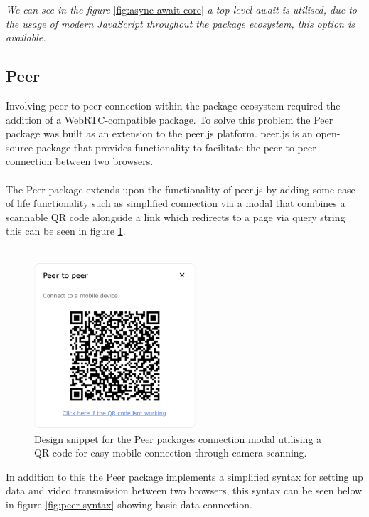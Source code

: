 \documentclass{l4proj}
\begin{document}
\textit{We can see in the figure }\ref{fig:async-await-core} \textit{a top-level await is utilised, due to the usage of modern JavaScript throughout the package ecosystem, this option is available.}

\subsection{Peer}
\text Involving peer-to-peer connection within the package ecosystem required the addition of a WebRTC-compatible package. To solve this problem the Peer package was built as an extension to the peer.js platform. peer.js is an open-source package that provides functionality to facilitate the peer-to-peer connection between two browsers. 
\\ \\
The Peer package extends upon the functionality of peer.js by adding some ease of life functionality such as simplified connection via a modal that combines a scannable QR code alongside a link which redirects to a page via query string this can be seen in figure \ref{fig:qr-scan}. 
\\ \\
\begin{figure}[!ht]
    \centering
    \includegraphics[width=6cm]{dissertation/images/QR-p2p-modal.png}
    \caption{Design snippet for the Peer packages connection modal utilising a QR code for easy mobile connection through camera scanning.}
    \label{fig:qr-scan}
\end{figure}

\text In addition to this the Peer package implements a simplified syntax for setting up data and video transmission between two browsers, this syntax can be seen below in figure \ref{fig:peer-syntax} showing basic data connection.
\end{document}
